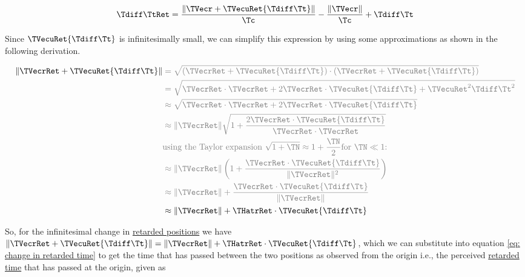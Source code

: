 \begin{equation}
	\label{eq: change in retarded time}
	\Tdiff \TtRet  =   \frac{\|\TVecr  + \TVecuRet  {\Tdiff \Tt } \|}{\Tc } -  \frac{\|\TVecr \|}{\Tc } + \Tdiff \Tt
\end{equation}

Since $\TVecuRet  {\Tdiff \Tt } $ is infinitesimally small, we can simplify this expression by using some approximations as shown in the following derivation.

\begin{equation}
	\begin{aligned}
		\|\TVecrRet  + \TVecuRet  {\Tdiff \Tt } \| & \color{gray} =  \sqrt{(\TVecrRet  + \TVecuRet  {\Tdiff \Tt } ) \cdot (\TVecrRet  + \TVecuRet  {\Tdiff \Tt } )}                                       \\
		                                   & \color{gray} = \sqrt{\TVecrRet  \cdot \TVecrRet  + 2 \TVecrRet  \cdot \TVecuRet  {\Tdiff \Tt }  + \TVecuRet^2  {\Tdiff \Tt }^2  } \\
		                                   & \color{gray} \approx \sqrt{\TVecrRet  \cdot \TVecrRet  + 2 \TVecrRet  \cdot \TVecuRet  {\Tdiff \Tt }  }                                 \\
		                                   & \color{gray} \approx \|\TVecrRet \| \sqrt{1 + \frac{2 \TVecrRet  \cdot \TVecuRet  {\Tdiff \Tt }  }{\TVecrRet  \cdot \TVecrRet  } }     \\
		                                   & \color{gray} \text{using the Taylor expansion $\sqrt{1 + \TN } \approx 1 + \frac{\TN }{2} \text{for } \TN  \ll 1$:}                           \\
		                                   & \color{gray} \approx \|\TVecrRet \| \left(1 + \frac{\TVecrRet  \cdot \TVecuRet  {\Tdiff \Tt }  }{\|\TVecrRet \|^2}\right)               \\
		                                   & \color{gray} \approx \|\TVecrRet \|  + \frac{\TVecrRet  \cdot \TVecuRet  {\Tdiff \Tt }  }{\|\TVecrRet \|}                               \\
		                                   & \approx \|\TVecrRet \|  + \THatrRet   \cdot \TVecuRet  {\Tdiff \Tt }
	\end{aligned}
\end{equation}

So, for the infinitesimal change in \hyperlink{def-retarded-position}{retarded positions} we have $\|\TVecrRet  + \TVecuRet  {\Tdiff \Tt } \|= \|\TVecrRet \|   + \THatrRet   \cdot \TVecuRet  {\Tdiff \Tt } $, which we can substitute into equation \eqref{eq: change in retarded time} to get the time that has passed between the two positions as observed from the origin i.e., the perceived \hyperlink{def-retarded-time}{retarded time} that has passed at the origin, given as

